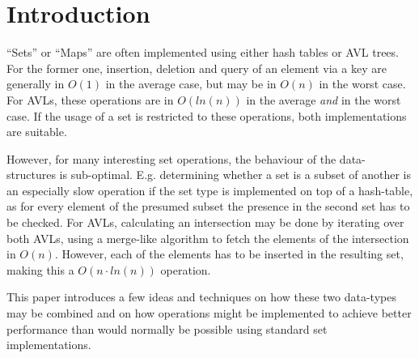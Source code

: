 \section{Introduction}


    ``Sets'' or ``Maps'' are often implemented using either hash tables or AVL
    trees.  For the former one, insertion, deletion and query of an element via
    a key are generally in $O(1)$ in the average case, but may be in $O(n)$ in
    the worst case.  For AVLs, these operations are in $O(ln(n))$ in the average
    \emph{and} in the worst case. If the usage of a set is restricted to these
    operations, both implementations are suitable.

    However, for many interesting set operations, the behaviour of the
    data-structures is sub-optimal. E.g. determining whether a set is a subset
    of another is an especially slow operation if the set type is implemented on
    top of a hash-table, as for every element of the presumed subset the
    presence in the second set has to be checked. For AVLs, calculating an
    intersection may be done by iterating over both AVLs, using a merge-like
    algorithm to fetch the elements of the intersection in $O(n)$. However, each
    of the elements has to be inserted in the resulting set, making this a
    $O(n\cdot ln(n))$ operation.

    This paper introduces a few ideas and techniques on how these two data-types
    may be combined and on how operations might be implemented to achieve better
    performance than would normally be possible using standard set
    implementations.

